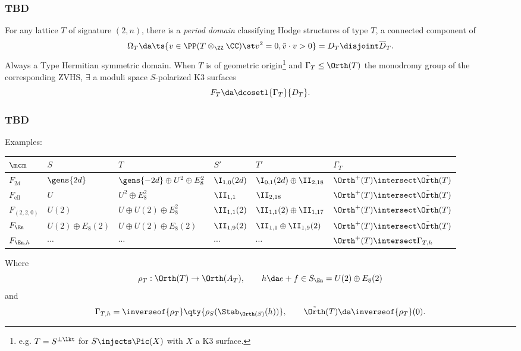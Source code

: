 \documentclass{beamer}
\begin{document}
{\begin{frame}
\end{frame}
\begin{frame}\frametitle{TBD}
For any lattice $T$ of signature $(2, n)$, there is a \textit{period domain} classifying Hodge structures of type $T$, a connected component of
\[
\Omega_T \da \ts{v\in \PP(T \otimes_\ZZ \CC) \st v^2 = 0, \bar{v}\cdot v > 0} = D_T \disjoint \overline{D}_T
.\]
Always a Type \IV Hermitian symmetric domain.
When $T$ is of geometric origin\footnote{e.g. $T = S^{\perp \lkt}$ for $S \injects \Pic(X)$ with $X$ a K3 surface.} and $\Gamma_T \leq \Orth(T)$ the monodromy group of the corresponding \textrm{ZVHS}, $\exists$ a moduli space $S$-polarized K3 surfaces
\[
F_T \da \dcosetl{\Gamma_T}{D_T}
.\]
\end{frame}
\begin{frame}\frametitle{TBD}
Examples:
{\tiny \begin{center}
\begin{tabular}{l|ll|ll|l}
	$\mcm$ & $S$ & $T$ & $S'$ & $T'$ & $\Gamma_T$ \\ \hline
	$F_{2d}$\cite{Sca87, Laz16, AET23}
		& $\gens{2d}$
		& $\gens{-2d} \oplus U^2 \oplus E_8^2$
		& $\I_{1,0}(2d)$
		& $\I_{0,1}(2d) \oplus \II_{2,18}$ 
		& $\Orth^+(T) \intersect \tilde{\Orth}(T)$ \\

	$F_{\mathrm{ell}}$\cite{ABE22}
		& $U$
		& $U^2 \oplus E_8^2$
		& $\II_{1,1}$
		& $\II_{2,18}$ 
		& $\Orth^+(T) \intersect \tilde{\Orth}(T)$ \\

	$F_{(2,2,0)}$\cite{AE22}
		& $U(2)$
		& $U \oplus U(2) \oplus E_8^2$
		& $\II_{1,1}(2)$
		& $\II_{1,1}(2) \oplus \II_{1,17}$ 
		& $\Orth^+(T) \intersect \tilde{\Orth}(T)$ \\

	$F_{\En}$\cite{Ste95a}
		& $U(2) \oplus E_8(2)$
		& $U \oplus U(2) \oplus E_8(2)$
		& $\II_{1,9}(2)$
		& $\II_{1,1} \oplus \II_{1,9}(2)$ 
		& $\Orth^+(T) \intersect \tilde{\Orth}(T)$ \\
		
	$F_{\En, h}$\cite{Ste95a}
		& $\cdots$
		& $\cdots$
		& $\cdots$
		& $\cdots$
		& $\Orth^+(T) \intersect \Gamma_{T, h}$ \\
\end{tabular}
\end{center}
}

Where
\[
\rho_T: \Orth(T) \to \Orth(A_T), \qquad h \da e + f \in S_{\En} = U(2) \oplus E_8(2)
\]
and
\[
\Gamma_{T, h} = \inverseof{\rho_T}\qty{ \rho_S(\Stab_{\Orth(S)}(h) ) },
\qquad
\tilde{\Orth}(T) \da  \inverseof{\rho_T}(0)
.\]


\end{frame}}
\end{document}
